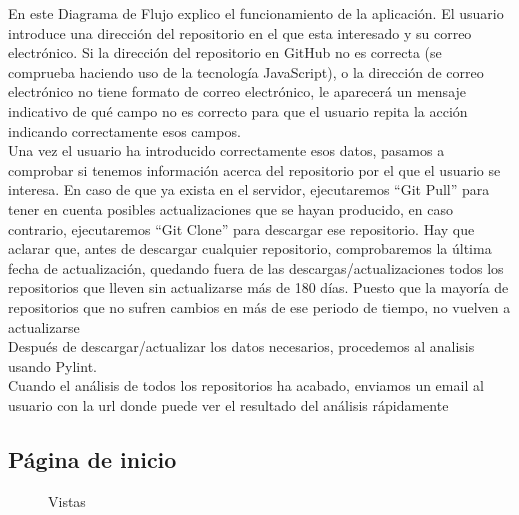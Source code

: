 \documentclass[a4paper, 12pt]{book}
\begin{document}
En este Diagrama de Flujo explico el funcionamiento de la aplicación. 
El usuario introduce una dirección del repositorio en el que esta interesado y su correo electrónico. Si la dirección del repositorio en GitHub no es correcta (se comprueba haciendo uso de la tecnología JavaScript), o la dirección de correo electrónico no tiene formato de correo electrónico, le aparecerá un mensaje indicativo de qué campo no es correcto para que el usuario repita la acción indicando correctamente esos campos.\\
Una vez el usuario ha introducido correctamente esos datos, pasamos a comprobar si tenemos información acerca del repositorio por el que el usuario se interesa. En caso de que ya exista en el servidor, ejecutaremos ``Git Pull'' para tener en cuenta posibles actualizaciones que se hayan producido, en caso contrario, ejecutaremos ``Git Clone'' para descargar ese repositorio. Hay que aclarar que, antes de descargar cualquier repositorio, comprobaremos la última fecha de actualización, quedando fuera de las descargas/actualizaciones todos los repositorios que lleven sin actualizarse más de 180 días. Puesto que la mayoría de repositorios que no sufren cambios en más de ese periodo de tiempo, no vuelven a actualizarse\\
Después de descargar/actualizar los datos necesarios, procedemos al analisis usando Pylint.\\
Cuando el análisis de todos los repositorios ha acabado, enviamos un email al usuario con la url donde puede ver el resultado del análisis rápidamente
\subsection{Página de inicio}
\begin{figure}[H]
 \centering
 \caption{Vistas}
 \label{f:Vistas}
\end{figure}
\end{document}
